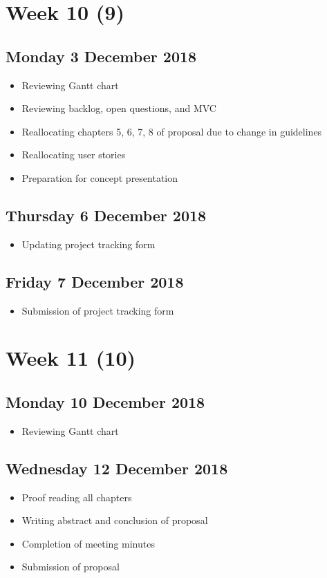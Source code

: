 \section*{Week 10 (9)}
\subsection*{Monday 3 December 2018}
\begin{itemize}
	\item Reviewing Gantt chart
	\item Reviewing backlog, open questions, and MVC
	\item Reallocating chapters 5, 6, 7, 8 of proposal due to change in guidelines
	\item Reallocating user stories
	\item Preparation for concept presentation
\end{itemize}

\subsection*{Thursday 6 December 2018}
\begin{itemize}
	\item Updating project tracking form
\end{itemize}

\subsection*{Friday 7 December 2018}
\begin{itemize}
	\item Submission of project tracking form
\end{itemize}

\section*{Week 11 (10)}
\subsection*{Monday 10 December 2018}
\begin{itemize}
	\item Reviewing Gantt chart
\end{itemize}

\subsection*{Wednesday 12 December 2018}
\begin{itemize}
	\item Proof reading all chapters
	\item Writing abstract and conclusion of proposal
	\item Completion of meeting minutes
	\item Submission of proposal
\end{itemize}
